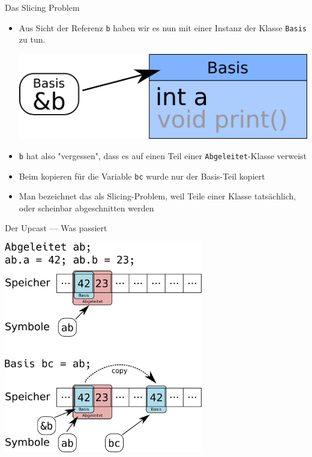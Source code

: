 \documentclass[presentation]{beamer}
\begin{document}
\begin{frame}[label={sec:org665b86c},fragile]{Das Slicing Problem}
 \begin{itemize}
\item Aus Sicht der Referenz {\color{solarizedYellow}\verb!b!} haben wir es nun mit einer Instanz der
Klasse {\color{solarizedYellow}\verb!Basis!} zu tun.

\begin{center}
\includegraphics[width=.9\linewidth]{img/slizing_small.png}
\end{center}
\item {\color{solarizedYellow}\verb!b!} hat also "vergessen", dass es auf einen Teil einer
{\color{solarizedYellow}\verb!Abgeleitet!}-Klasse verweist
\item Beim kopieren für die Variable {\color{solarizedYellow}\verb!bc!} wurde nur der Basis-Teil kopiert
\item Man bezeichnet das als Slicing-Problem, weil Teile einer Klasse
tatsächlich, oder scheinbar abgeschnitten werden
\end{itemize}
\end{frame}
\begin{frame}[label={sec:orgb22d80d}]{Der Upcast --- Was passiert}
\begin{center}
\includegraphics[width=0.65\textwidth]{img/upcast.png}
\end{center}
\end{frame}
\end{document}

